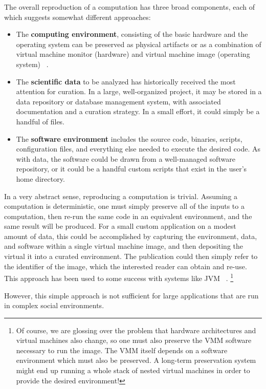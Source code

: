 \documentclass{sig-alternate}
\begin{document}
The overall reproduction of a computation has three broad components,
each of which suggests somewhat different approaches:

\begin{itemize}
\item The {\bf computing environment}, consisting of the basic hardware and the operating system can be preserved as physical artifacts or as a combination of virtual machine monitor (hardware) and virtual machine image (operating system) ~\cite{matthews2009towards}.
\item The {\bf scientific data} to be analyzed has historically received the most attention for curation.  In a large, well-organized project, it may be stored in a  data repository or database management system, with associated documentation and a curation strategy.  In a small effort, it could simply be a handful of files.
\item The {\bf software environment} includes the source code, binaries, scripts, configuration files, and everything else needed to execute the desired code.  As with data, the software could be drawn from a well-managed software repository, or it could be a handful custom scripts that exist in the user's home directory.
\end{itemize}

In a very abstract sense, reproducing a computation is trivial.
Assuming a computation is deterministic, one must simply
preserve all of the inputs to a computation, then re-run
the same code in an equivalent environment, and the same result
will be produced.  For a small custom application on a modest
amount of data, this could be accomplished by capturing the environment,
data, and software within a single virtual machine image,
and then depositing the virtual
it into a curated environment.  The publication could
then simply refer to the identifier of the image, which the
interested reader can obtain and re-use. This approach has
been used to some success with systems like JVM ~\cite{barthe2008preservation}.
\footnote{Of course, we are glossing over the problem that hardware
architectures and virtual machines also change, so one must also
preserve the VMM software necessary to run the image.  The VMM itself
depends on a software environment which must also be preserved.
A long-term preservation system might end up running a whole
stack of nested virtual machines in order to provide the desired
environment! }

However, this simple approach is not sufficient for large applications
that are run in complex social environments.
\end{document}
